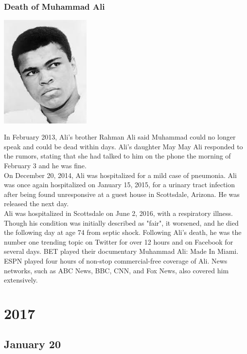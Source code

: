 \documentclass[11pt]{report}
\begin{document}
\subsection{Death of Muhammad Ali}
\vspace{2mm}\begin{center}\includegraphics[width=4.5cm]{./img/muhammadAli.jpg}\end{center}
In February 2013, Ali's brother Rahman Ali said Muhammad could no longer speak and could be dead within days. Ali's daughter May May Ali responded to the rumors, stating that she had talked to him on the phone the morning of February 3 and he was fine.\\
\indent On December 20, 2014, Ali was hospitalized for a mild case of pneumonia. Ali was once again hospitalized on January 15, 2015, for a urinary tract infection after being found unresponsive at a guest house in Scottsdale, Arizona. He was released the next day.\\
\indent Ali was hospitalized in Scottsdale on June 2, 2016, with a respiratory illness. Though his condition was initially described as "fair", it worsened, and he died the following day at age 74 from septic shock. Following Ali's death, he was the number one trending topic on Twitter for over 12 hours and on Facebook for several days. BET played their documentary Muhammad Ali: Made In Miami. ESPN played four hours of non-stop commercial-free coverage of Ali. News networks, such as ABC News, BBC, CNN, and Fox News, also covered him extensively.

\chapter{2017}
\section{January 20}
\end{document}
